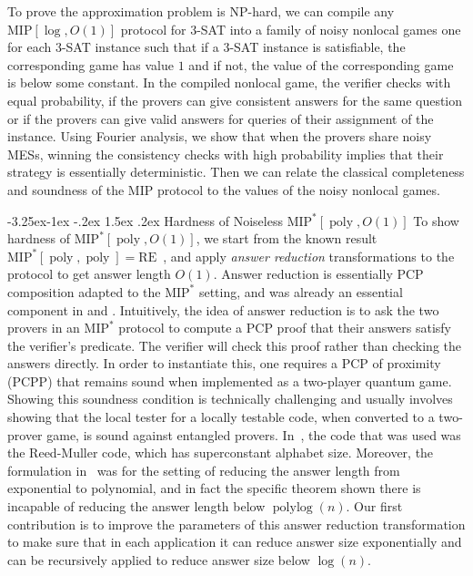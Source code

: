 \documentclass[10pt,a4paper]{article}
\makeatletter
\renewcommand{\subsubsection}{\@startsection{subsubsection}{2}{\z@}%
             {-3.25ex\@plus -1ex \@minus -.2ex}%
             {1.5ex \@plus .2ex}%
             {\normalfont\normalsize\scshape\bfseries}}
\theoremstyle{plain}
\theoremstyle{definition}
\newcommand{\poly} {\ensuremath{\operatorname{poly}}}
\newcommand{\polylog} {\ensuremath{\operatorname{polylog}}}
\newcommand{\1}{\mathbb{1}} %
\newcommand{\MIP}{\mathrm{MIP}}
\newcommand{\RE}{\mathrm{RE}}
\newcommand{\NP}{\mathrm{NP}}
\makeatother
\begin{document}
To prove the approximation problem is $\NP$-hard, we can compile any $\MIP[\log, O(1)]$ protocol for $3$-SAT into a family of noisy nonlocal games one for each $3$-SAT instance such that if a $3$-SAT instance is satisfiable, the corresponding game has value $1$ and if not, the value of the corresponding game is below some constant. 
In the compiled nonlocal game, the verifier checks with equal probability, if the provers can give consistent answers for the same question or if the provers can give valid answers for queries of their assignment of the instance.
Using Fourier analysis, we show that when the provers share noisy MESs, winning the consistency checks with high probability implies that their strategy is essentially deterministic. Then we can relate the classical completeness and soundness 
of the $\MIP$ protocol to the values of the noisy nonlocal games.

\subsubsection{Hardness of Noiseless \texorpdfstring{$\MIP^*[\poly, O(1)]$}{MIP*[poly, O(1)]}}
To show hardness of $\MIP^*[\poly, O(1)]$, we start from the known result $\MIP^*[\poly, \poly] = \RE$~\cite{JNVWY'20}, and apply \emph{answer reduction} transformations to the protocol to get answer length $O(1)$. Answer reduction is essentially PCP composition adapted to the $\MIP^*$ setting, and was already an essential component in \cite{neexp} and \cite{JNVWY'20}. Intuitively, the idea of answer reduction is to ask the two provers in an $\MIP^*$ protocol to compute a PCP proof that their answers satisfy the verifier's predicate. The verifier will check this proof rather than checking the answers directly. In order to instantiate this, one requires a PCP of proximity (PCPP) that remains sound when implemented as a two-player quantum game. Showing this soundness condition is technically challenging and usually involves showing that the local tester for a locally testable code, when converted to a two-prover game, is sound against entangled provers. In~\cite{JNVWY'20}, the code that was used was the Reed-Muller code, which has superconstant alphabet size.
Moreover, the formulation in~\cite{JNVWY'20} was for the setting of reducing the answer length from exponential to polynomial, and in fact the specific theorem shown there is incapable of reducing the answer length below $\polylog(n)$. Our first contribution is to improve the parameters of this answer reduction transformation to make sure that in each application it can reduce answer size exponentially and can be recursively applied to reduce answer size below $\log(n)$.
\end{document}
